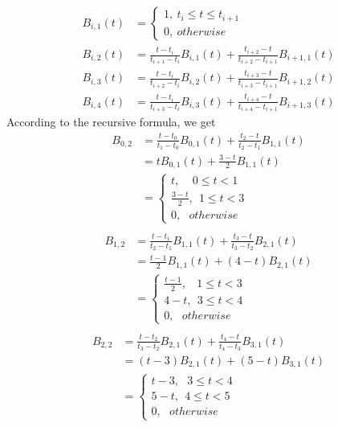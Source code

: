 \documentclass[12pt,a4paper]{article}
\theoremstyle{definition}
\numberwithin{equation}{section}
\numberwithin{figure}{section}
\begin{document}
\begin{align*}
B_{i,1}(t)&=\left\{
\begin{array}{lr}
1,~t_i\leq t \leq t_{i+1}\\
0,~otherwise
\end{array}
\right.\\
B_{i,2}(t) &= \frac{t-t_i}{t_{i+1}-t_i}B_{i,1}(t)+\frac{t_{i+2}-t}{t_{i+2}-t_{i+1}}B_{i+1,1}(t)\\
B_{i,3}(t) &= \frac{t-t_i}{t_{i+2}-t_i}B_{i,2}(t)+\frac{t_{i+3}-t}{t_{i+3}-t_{i+1}}B_{i+1,2}(t)\\
B_{i,4}(t) &= \frac{t-t_i}{t_{i+3}-t_i}B_{i,3}(t)+\frac{t_{i+4}-t}{t_{i+4}-t_{i+1}}B_{i+1,3}(t)
\end{align*}
According to the recursive formula, we get
\begin{align*}
B_{0,2}&= \frac{t-t_0}{t_{1}-t_0}B_{0,1}(t)+\frac{t_{2}-t}{t_{2}-t_{1}}B_{1,1}(t)\\
&=tB_{0,1}(t)+\frac{3-t}{2}B_{1,1}(t)\\
&=\left\{
\begin{array}{lr}
t, ~~~~~0\leq t< 1\\
\frac{3-t}{2}, ~~1\leq t<3\\
0,~~~otherwise
\end{array}
\right.\\
\end{align*}
\begin{align*}
B_{1,2}&= \frac{t-t_1}{t_{2}-t_1}B_{1,1}(t)+\frac{t_{3}-t}{t_{3}-t_{2}}B_{2,1}(t)\\
&=\frac{t-1}{2}B_{1,1}(t)+(4-t)B_{2,1}(t)\\
&=\left\{
\begin{array}{lr}
\frac{t-1}{2}, ~~~~1\leq t< 3\\
4-t, ~~3\leq t<4\\
0,~~~otherwise
\end{array}
\right.\\
\end{align*}
\begin{align*}
B_{2,2}&= \frac{t-t_2}{t_{3}-t_2}B_{2,1}(t)+\frac{t_{4}-t}{t_{4}-t_{3}}B_{3,1}(t)\\
&=(t-3)B_{2,1}(t)+(5-t)B_{3,1}(t)\\
&=\left\{
\begin{array}{lr}
t-3, ~~~3\leq t< 4\\
5-t, ~~4\leq t<5\\
0,~~~otherwise
\end{array}
\right.\\
\end{align*}
\end{document}
